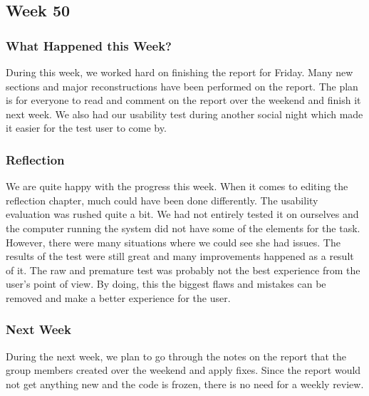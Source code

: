 \subsection{Week 50}
\subsubsection{What Happened this Week?}
During this week, we worked hard on finishing the report for Friday. Many new
sections and major reconstructions have been performed on the report. The plan
is for everyone to read and comment on the report over the weekend and finish
it next week. We also had our usability test during another social night which
made it easier for the test user to come by.

\subsubsection{Reflection}
We are quite happy with the progress this week. When it comes to editing
the reflection chapter, much could have been done differently. The
usability evaluation was rushed quite a bit. We had not entirely tested it on
ourselves and the computer running the system did not have some of the elements
for the task.
However, there were many situations where we could see she had issues. The
results of the test were still great and many improvements happened as a result
of it. The raw and premature test was probably not the best experience from the
user's point of view.
By doing, this the biggest flaws and mistakes can be removed and
make a better experience for the user.

\subsubsection{Next Week}
During the next week, we plan to go through the notes on the report that the
group members created over the weekend and apply fixes. Since the report would not get
anything new and the code is frozen, there is no need for a weekly review.
